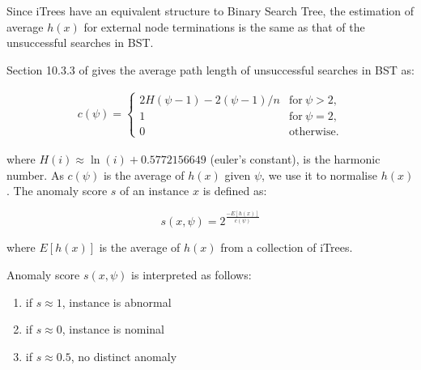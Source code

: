 Since iTrees have an equivalent structure to Binary Search Tree, the estimation of average $h(x)$ for external node terminations is the same as that of the unsuccessful searches in BST.

Section 10.3.3 of \cite{10.5555/289373} gives the average path length of unsuccessful searches
in BST as:

\vspace{-2em}
\begin{equation}
    \label{eq:average-path-length-of-unsuccessful-searches-bst}
    \begin{split}
        c(\psi) =  \left\{
        \begin{matrix}
            2H(\psi -1) - 2(\psi -1)/n & \text{for}\: \psi>2,\\
            1 &  \text{for}\: \psi=2,\\
            0 & \text{otherwise.}
        \end{matrix}\right.
    \end{split}
\end{equation}

where $H(i) \approx \ln(i) + 0.5772156649$  (euler's constant), is the harmonic number. As $c(\psi)$ is the average of $h(x)$ given $\psi$, we use it to normalise $h(x)$. The anomaly score $s$ of an instance $x$ is defined as:

\begin{equation}
    \label{eq:iforest-anomaly-score-for-an-instance}
    s(x,\psi) = 2^{\frac{-E[h(x)]}{c(\psi)}}
\end{equation}

where $E[h(x)]$ is the average of $h(x)$ from a collection of iTrees. 

Anomaly score $s(x,\psi)$ is interpreted as follows:

\begin{enumerate}
    \vspace{-1em}
    \setlength\itemsep{-1em}
    \item if $s \approx 1$, instance is abnormal
    \item if $s \approx 0$, instance is nominal
    \item if $s \approx 0.5$, no distinct anomaly
\end{enumerate}

